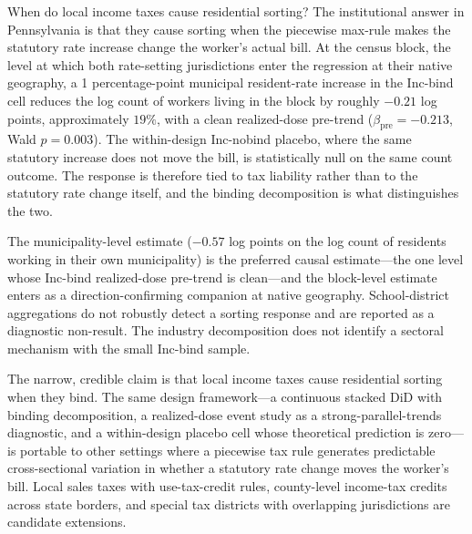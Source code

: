 \documentclass[12pt]{article}
\begin{document}
When do local income taxes cause residential sorting? The
institutional answer in Pennsylvania is that they cause sorting
when the piecewise max-rule makes the statutory rate increase
change the worker's actual bill. At the census block, the level at
which both rate-setting jurisdictions enter the regression at their
native geography, a 1 percentage-point municipal resident-rate
increase in the Inc-bind cell reduces the log count of workers
living in the block by roughly $-0.21$ log points, approximately
$19\%$, with a clean realized-dose pre-trend
($\beta_{\text{pre}} = -0.213$, Wald $p=0.003$). The within-design
Inc-nobind placebo, where the same statutory increase does not move
the bill, is statistically null on the same count outcome. The
response is therefore tied to tax liability rather than to the
statutory rate change itself, and the binding decomposition
is what distinguishes the two.

The municipality-level estimate ($-0.57$ log points on the
log count of residents working in their own municipality) is the
preferred causal estimate---the one level whose Inc-bind realized-dose
pre-trend is clean---and the block-level estimate enters as a
direction-confirming companion at native geography.
School-district aggregations do not robustly detect a sorting
response and are reported as a diagnostic non-result. The industry
decomposition does not identify a sectoral mechanism with the
small Inc-bind sample.

The narrow, credible claim is that local income taxes cause
residential sorting when they bind. The same design framework---a
continuous stacked DiD with binding decomposition, a
realized-dose event study as a strong-parallel-trends diagnostic,
and a within-design placebo cell whose theoretical prediction is
zero---is portable to other settings where a piecewise tax rule
generates predictable cross-sectional variation in whether a
statutory rate change moves the worker's bill. Local sales taxes
with use-tax-credit rules, county-level income-tax credits across
state borders, and special tax districts with overlapping
jurisdictions are candidate extensions.


\printbibliography
\end{document}
